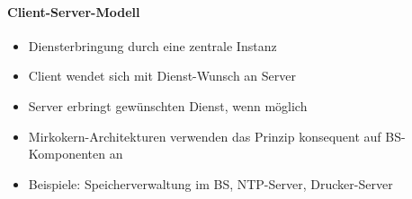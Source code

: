 \documentclass[a4paper,12pt]{article}
\begin{document}
\paragraph{Client-Server-Modell}
\begin{itemize}
\item Diensterbringung durch eine zentrale Instanz
\item Client wendet sich mit Dienst-Wunsch an Server
\item Server erbringt gewünschten Dienst, wenn möglich
\item Mirkokern-Architekturen verwenden das Prinzip konsequent auf BS-Komponenten an
\item Beispiele: Speicherverwaltung im BS, NTP-Server, Drucker-Server
\end{itemize}
\end{document}
